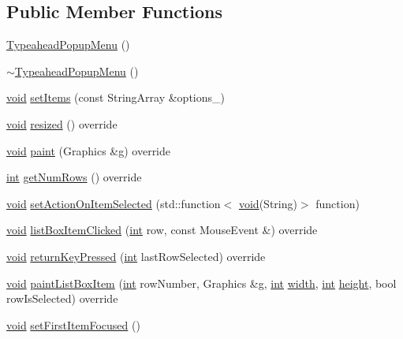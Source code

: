 \subsection*{Public Member Functions}
\begin{DoxyCompactItemize}
\item 
\hyperlink{class_typeahead_popup_menu_a877b636f8a9475e8fb5547491de02716}{Typeahead\+Popup\+Menu} ()
\item 
\hyperlink{class_typeahead_popup_menu_a0d2818d9cdac33de4f6af61b1220c193}{$\sim$\+Typeahead\+Popup\+Menu} ()
\item 
\hyperlink{tk_8h_aba408b7cd755a96426e004c015f5de8e}{void} \hyperlink{class_typeahead_popup_menu_a8aaf8378f05583ea02b7a37820b22869}{set\+Items} (const String\+Array \&options\+\_\+)
\item 
\hyperlink{tk_8h_aba408b7cd755a96426e004c015f5de8e}{void} \hyperlink{class_typeahead_popup_menu_aaaf5c6cc15d0c822f129ddbbf2ab8e0c}{resized} () override
\item 
\hyperlink{tk_8h_aba408b7cd755a96426e004c015f5de8e}{void} \hyperlink{class_typeahead_popup_menu_aee87bc561a1b813b5d6e9aa29f0ede0a}{paint} (Graphics \&g) override
\item 
\hyperlink{tk_8h_a83f82f76e7fed06f4c49d2db94028a6d}{int} \hyperlink{class_typeahead_popup_menu_acd831e27150e6264f15e797f22960648}{get\+Num\+Rows} () override
\item 
\hyperlink{tk_8h_aba408b7cd755a96426e004c015f5de8e}{void} \hyperlink{class_typeahead_popup_menu_af277a50a6c5c49e1ade6732bb82f4ad9}{set\+Action\+On\+Item\+Selected} (std\+::function$<$ \hyperlink{tk_8h_aba408b7cd755a96426e004c015f5de8e}{void}(String)$>$ function)
\item 
\hyperlink{tk_8h_aba408b7cd755a96426e004c015f5de8e}{void} \hyperlink{class_typeahead_popup_menu_a764bbdbdd904c7e6aad931bc00ca9050}{list\+Box\+Item\+Clicked} (\hyperlink{tk_8h_a83f82f76e7fed06f4c49d2db94028a6d}{int} row, const Mouse\+Event \&) override
\item 
\hyperlink{tk_8h_aba408b7cd755a96426e004c015f5de8e}{void} \hyperlink{class_typeahead_popup_menu_ac9cd24de1208af4d8d5720490ccddded}{return\+Key\+Pressed} (\hyperlink{tk_8h_a83f82f76e7fed06f4c49d2db94028a6d}{int} last\+Row\+Selected) override
\item 
\hyperlink{tk_8h_aba408b7cd755a96426e004c015f5de8e}{void} \hyperlink{class_typeahead_popup_menu_a96d37090528b014303917c4266ddee46}{paint\+List\+Box\+Item} (\hyperlink{tk_8h_a83f82f76e7fed06f4c49d2db94028a6d}{int} row\+Number, Graphics \&g, \hyperlink{tk_8h_a83f82f76e7fed06f4c49d2db94028a6d}{int} \hyperlink{tk_8h_a29e50a5401c1396b3a2aa3487f74d468}{width}, \hyperlink{tk_8h_a83f82f76e7fed06f4c49d2db94028a6d}{int} \hyperlink{tk_8h_a67be2f4b9d9c5b3559139bfb072e2e81}{height}, bool row\+Is\+Selected) override
\item 
\hyperlink{tk_8h_aba408b7cd755a96426e004c015f5de8e}{void} \hyperlink{class_typeahead_popup_menu_aed235641398929232116e95177aac229}{set\+First\+Item\+Focused} ()
\end{DoxyCompactItemize}


